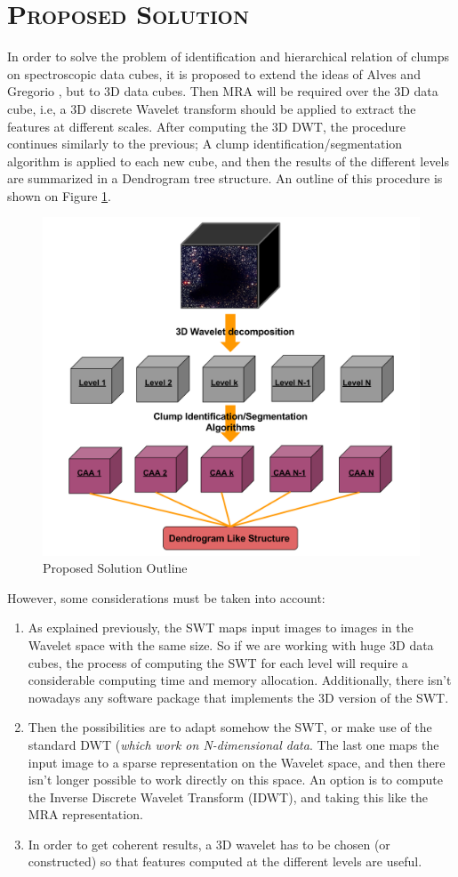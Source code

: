 \documentclass[letter, 11pt]{article}
\begin{document}
\section{\textsc{Proposed Solution}}
In order to solve the problem of identification and hierarchical relation of clumps on spectroscopic data cubes, it is proposed to extend the ideas of Alves \cite{Alves} and Gregorio \cite{Gregorio}, but to 3D data cubes. Then MRA will be required over the 3D data cube, i.e, a 3D discrete Wavelet transform should be applied to extract the features at different scales. After computing the 3D DWT, the procedure continues similarly to the previous; A clump identification/segmentation algorithm is applied to each new cube, and then the results of the different levels are summarized in a Dendrogram tree structure. An outline of this procedure is shown on Figure \ref{fig:wavclump}.
\begin{figure}[htpb!]
\centering
\includegraphics[width=12cm]{wavclump}
\caption{Proposed Solution Outline}
\label{fig:wavclump}
\end{figure}
However, some considerations must be taken into account:
\begin{enumerate}
    \item As explained previously, the SWT maps input images to images in the Wavelet space with the same size. So if we are working with huge 3D data cubes, the process of computing the SWT for each level will require a considerable computing time and memory allocation. Additionally, there isn't nowadays any software package that implements the 3D version of the SWT.
    \item Then the possibilities are to adapt somehow the SWT, or make use of the standard DWT (\textit{which work on N-dimensional data}. The last one maps the input image to a sparse representation on the Wavelet space, and then there isn't longer possible to work directly on this space. An option is to compute the Inverse Discrete Wavelet Transform (IDWT), and taking this like the MRA representation.
    \item In order to get coherent results, a 3D wavelet has to be chosen (or constructed) so that features computed at the different levels are useful.
\end{enumerate}
\end{document}
